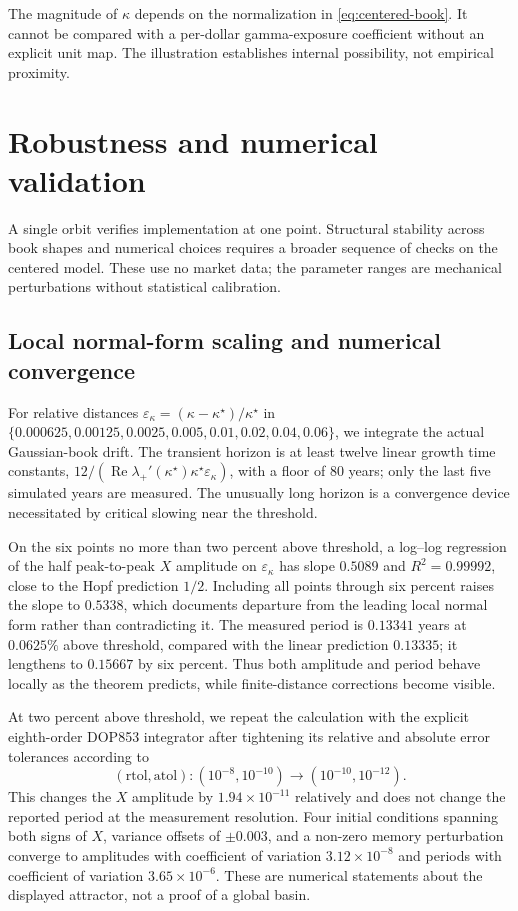 \documentclass[11pt]{article}
\begin{document}
The magnitude of $\kappa$ depends on the normalization in
\eqref{eq:centered-book}.  It cannot be compared with a per-dollar gamma-exposure coefficient
without an explicit unit map.  The illustration establishes internal possibility, not empirical
proximity.

\section{Robustness and numerical validation}
\label{sec:robustness}

A single orbit verifies implementation at one point.  Structural stability across book shapes
and numerical choices requires a broader sequence of checks on the centered model.  These use
no market data; the parameter ranges are mechanical perturbations without statistical
calibration.

\subsection{Local normal-form scaling and numerical convergence}

For relative distances
$\varepsilon_\kappa=(\kappa-\kappa^\star)/\kappa^\star$ in
$\{0.000625,0.00125,0.0025,0.005,0.01,0.02,0.04,0.06\}$, we integrate the actual
Gaussian-book drift.  The transient
horizon is at least twelve linear growth time constants,
$12/(\operatorname{Re}\lambda_+'(\kappa^\star)\kappa^\star\varepsilon_\kappa)$,
with a floor of 80 years; only the last five simulated years are measured.  The unusually
long horizon is a convergence device necessitated by critical slowing near the threshold.

On the six points no more than two percent above threshold, a log--log regression of the
half peak-to-peak $X$ amplitude on $\varepsilon_\kappa$ has slope $0.5089$ and
$R^2=0.99992$, close to the Hopf prediction $1/2$.  Including all points through six percent
raises the slope to $0.5338$, which documents
departure from the leading local normal form rather than contradicting it.  The measured
period is $0.13341$ years at $0.0625\%$ above threshold, compared with the linear prediction
$0.13335$; it lengthens to $0.15667$ by six percent.  Thus both amplitude and period behave
locally as the theorem predicts, while finite-distance corrections become visible.

At two percent above threshold, we repeat the calculation with the explicit eighth-order
DOP853 integrator after tightening its relative and absolute error tolerances according to
\[
(\mathrm{rtol},\mathrm{atol}):(10^{-8},10^{-10})\longrightarrow(10^{-10},10^{-12}).
\]
This changes the $X$ amplitude by
$1.94\times10^{-11}$ relatively and does not change the reported period at the measurement
resolution.  Four initial conditions spanning both signs of $X$, variance offsets of
$\pm0.003$, and a non-zero memory perturbation converge to amplitudes with coefficient of
variation $3.12\times10^{-8}$ and periods with coefficient of variation
$3.65\times10^{-6}$.  These are numerical statements about the displayed attractor, not a
proof of a global basin.
\end{document}
